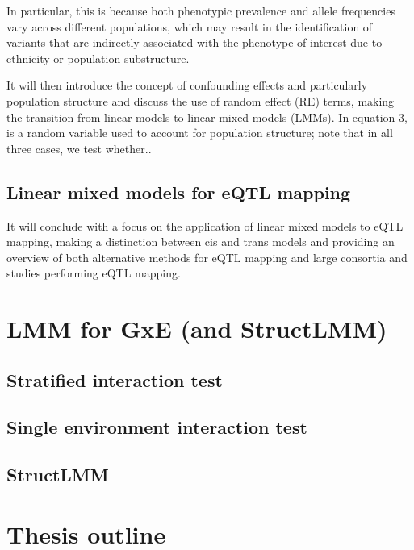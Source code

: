 In particular, this is because both phenotypic prevalence and allele frequencies vary across different populations, which may result in the identification of variants that are indirectly associated with the phenotype of interest due to ethnicity or population substructure.

It will then introduce the concept of confounding effects and particularly population structure and discuss the use of random effect (RE) terms, making the transition from linear models to linear mixed models (LMMs). 
In equation 3,  is a random variable used to account for population structure; note that in all three cases, we test whether..

\subsection{Linear mixed models for eQTL mapping}

It will conclude with a focus on the application of linear mixed models to eQTL mapping, making a distinction between cis and trans models and providing an overview of both alternative methods for eQTL mapping and large consortia and studies performing eQTL mapping.


\section{LMM for GxE (and StructLMM)}

\subsection{Stratified interaction test}
\subsection{Single environment interaction test}
\subsection{StructLMM}

\section{Thesis outline}